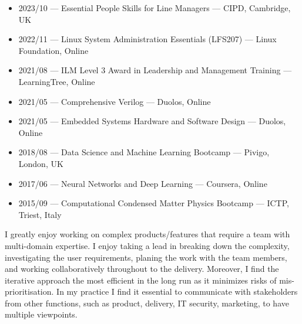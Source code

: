 \documentclass[10pt,a4paper,ragged2e,withhyper]{altacv}
\begin{document}
\begin{paracol}{2}
\begin{itemize}
    
    \item
    2023/10 --- Essential People Skills for Line Managers ---
    CIPD, Cambridge, UK

    \item
    2022/11 --- Linux System Administration Essentials (LFS207) ---
    Linux Foundation, Online
    
    \item
    2021/08 --- ILM Level 3 Award in Leadership and Management Training ---
    LearningTree, Online
    
    \item
    2021/05 --- Comprehensive Verilog --- Duolos, Online
    
    \item
    2021/05 --- Embedded Systems Hardware and Software Design ---
    Duolos, Online
    
    \item
    2018/08 --- Data Science and Machine Learning Bootcamp ---
    Pivigo, London, UK
    
    \item
    2017/06 --- Neural Networks and Deep Learning ---
    Coursera, Online
    
    \item
    2015/09 --- Computational Condensed Matter Physics Bootcamp ---
    ICTP, Triest, Italy
    
\end{itemize}




I greatly enjoy working on complex products/features that require a team with
multi-domain expertise.
I enjoy taking a lead in breaking down the complexity, investigating the user
requirements, planing the work with the team members, and working
collaboratively throughout to the delivery.
Moreover, I find the iterative approach the most efficient in the long run
as it minimizes risks of mis-prioritisation.
In my practice I find it essential to communicate with stakeholders from
other functions, such as product, delivery, IT security, marketing, to have
multiple viewpoints.


\end{paracol}
\end{document}
